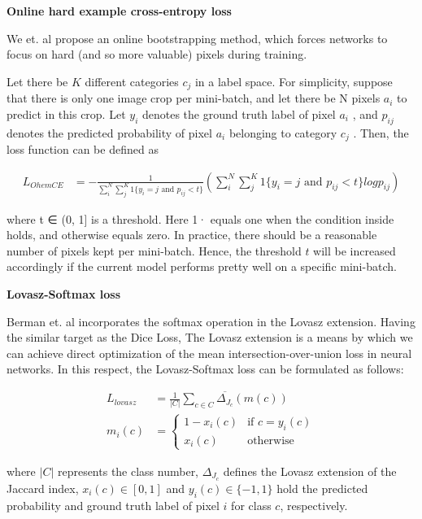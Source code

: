 \textbf{Online hard example cross-entropy loss}

We et. al \cite{ohemce16wu} propose an online bootstrapping method, which forces networks to focus on hard (and so more valuable) pixels during training. 

Let there be $K$ different categories $c_j$ in a label space. For simplicity, suppose that there is only one image crop per mini-batch, and let there be N pixels $a_i$ to predict in this crop. Let $y_i$ denotes the ground truth label of pixel $a_i$
, and $p_{ij}$ denotes the predicted probability of
pixel $a_i$ belonging to category $c_j$ . Then, the loss function can be defined as

\begin{align}
        L_{OhemCE} &= - \frac{1}{\sum_{i}^{N} \sum_{j}^{K} 1 \{y_i = j \text{ and } p_{ij} < t\}} (\sum_{i}^{N} \sum_{j}^{K} 1 \{y_i = j \text{ and } p_{ij} < t\} log p_{ij})
\end{align}

where t ∈ (0, 1] is a threshold. Here 1{·} equals one when the condition inside holds, and otherwise equals zero. In practice, there should be a reasonable number of pixels kept per mini-batch. Hence, the threshold $t$ will be increased accordingly if the current model performs pretty well on a specific mini-batch.

\textbf{Lovasz-Softmax loss}

 Berman et. al \cite{lovasz18berman} incorporates the softmax operation in the Lovasz extension. Having the similar target as the Dice Loss, The Lovasz extension is a means by which we can achieve direct optimization of the mean intersection-over-union loss in neural networks. In this respect, the Lovasz-Softmax loss can be formulated as follows:
 
 \begin{align}
        L_{lovasz} &= \frac{1}{|C|} \sum_{c \in C} \overline{\Delta_{J_c}} (m(c)) \\
        m_i(c) &= \begin{cases}
                        1 - x_i(c)  & \text{if } c = y_i(c) \\
                        x_i(c)    & \text{otherwise}
                    \end{cases}
\end{align}

where $|C|$ represents the class number, $\Delta_{J_c}$ defines the Lovasz extension of the Jaccard index, $x_i(c) \in [0,1]$ and $y_i (c) \in \{-1,1\}$ hold the predicted probability and ground truth label of pixel $i$ for class $c$, respectively.